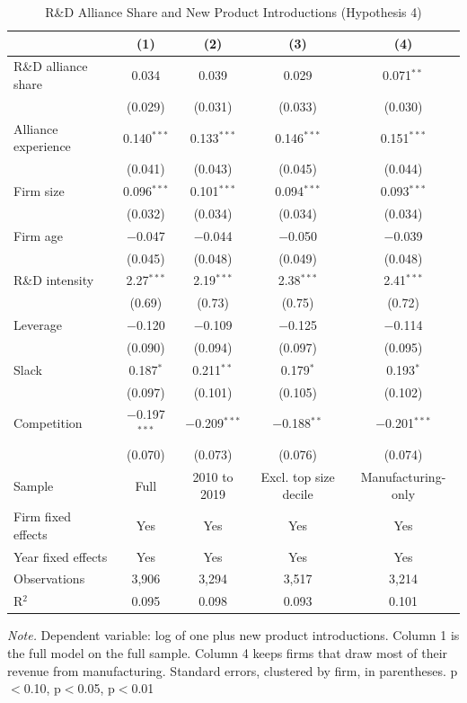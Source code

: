 \documentclass[12pt]{article}
\begin{document}
\clearpage

\begin{table}[p]
\centering\small
\caption{R\&D Alliance Share and New Product Introductions (Hypothesis 4)}
\begin{tabular}{lcccc}
\toprule
 & (1) & (2) & (3) & (4) \\
\midrule
R\&D alliance share & 0.034 & 0.039 & 0.029 & 0.071$^{**}$ \\
 & (0.029) & (0.031) & (0.033) & (0.030) \\[2pt]
Alliance experience & 0.140$^{***}$ & 0.133$^{***}$ & 0.146$^{***}$ & 0.151$^{***}$ \\
 & (0.041) & (0.043) & (0.045) & (0.044) \\[2pt]
Firm size & 0.096$^{***}$ & 0.101$^{***}$ & 0.094$^{***}$ & 0.093$^{***}$ \\
 & (0.032) & (0.034) & (0.034) & (0.034) \\[2pt]
Firm age & $-$0.047 & $-$0.044 & $-$0.050 & $-$0.039 \\
 & (0.045) & (0.048) & (0.049) & (0.048) \\[2pt]
R\&D intensity & 2.27$^{***}$ & 2.19$^{***}$ & 2.38$^{***}$ & 2.41$^{***}$ \\
 & (0.69) & (0.73) & (0.75) & (0.72) \\[2pt]
Leverage & $-$0.120 & $-$0.109 & $-$0.125 & $-$0.114 \\
 & (0.090) & (0.094) & (0.097) & (0.095) \\[2pt]
Slack & 0.187$^{*}$ & 0.211$^{**}$ & 0.179$^{*}$ & 0.193$^{*}$ \\
 & (0.097) & (0.101) & (0.105) & (0.102) \\[2pt]
Competition & $-$0.197$^{***}$ & $-$0.209$^{***}$ & $-$0.188$^{**}$ & $-$0.201$^{***}$ \\
 & (0.070) & (0.073) & (0.076) & (0.074) \\[2pt]
\midrule
Sample & Full & 2010 to 2019 & Excl. top size decile & Manufacturing-only \\
Firm fixed effects & Yes & Yes & Yes & Yes \\
Year fixed effects & Yes & Yes & Yes & Yes \\
Observations & 3,906 & 3,294 & 3,517 & 3,214 \\
R$^2$ & 0.095 & 0.098 & 0.093 & 0.101 \\
\bottomrule
\end{tabular}
\begin{minipage}{0.92\textwidth}\footnotesize\smallskip
\textit{Note.} Dependent variable: log of one plus new product introductions. Column 1 is the full model on the full sample. Column 4 keeps firms that draw most of their revenue from manufacturing. Standard errors, clustered by firm, in parentheses. \textasteriskcentered{} p$<$0.10, \textasteriskcentered{}\textasteriskcentered{} p$<$0.05, \textasteriskcentered{}\textasteriskcentered{}\textasteriskcentered{} p$<$0.01
\end{minipage}
\end{table}
\clearpage
\end{document}
